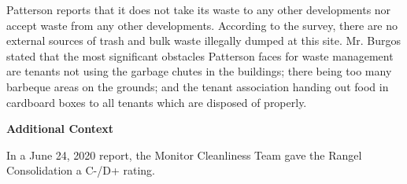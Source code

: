 Patterson reports that it does not take its waste to any other developments nor accept waste from any other developments. According to the survey,  there are no external sources of trash and bulk waste illegally dumped at this site. Mr. Burgos stated that the most significant obstacles Patterson faces for waste management are tenants not using the garbage chutes in the buildings; there being too many barbeque areas on the grounds; and the tenant association handing out food in cardboard boxes to all tenants which are disposed of properly.

\textbf{Additional Context} 

In a June 24, 2020 report, the Monitor Cleanliness Team gave the Rangel Consolidation a C-/D+ rating.  